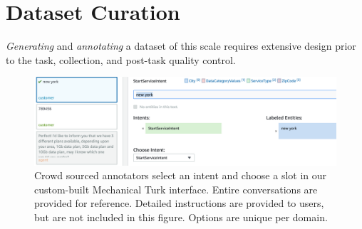\section{\multidogo Dataset Curation}

\textit{Generating} and \textit{annotating} a dataset of this scale requires extensive design prior to the task, collection, and post-task quality control.  

\begin{figure}
	\centering
	\includegraphics[width=\linewidth]{denis_proposal/sections/multidogo/figures/ic_sl-v3.png}
	\caption{Crowd sourced annotators select an intent and choose a slot in our custom-built Mechanical Turk interface.  Entire conversations are provided for reference.  Detailed instructions are provided to users, but are not included in this figure. Options are unique per domain.}%
	\label{fig:SlotAnnotation}
\end{figure}

